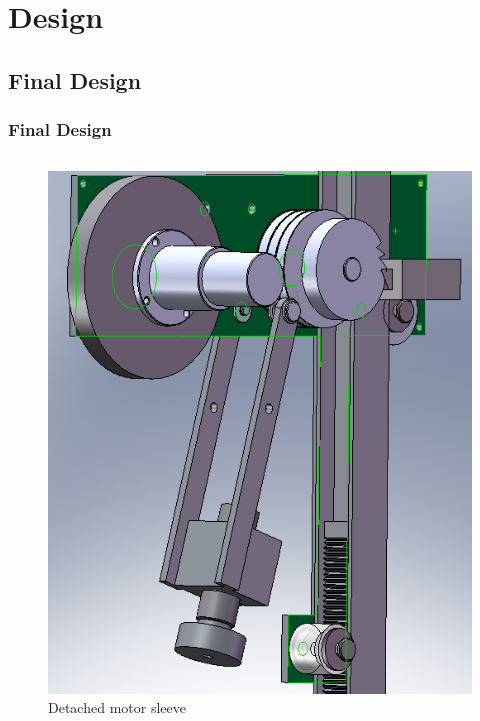 \section{Design}
\subsection*{Final Design}

\begin{frame}
\frametitle{Final Design}

\begin{columns}

\begin{figure}
\centering
\includegraphics[width=\textwidth]{fig/hopper_detach.png}
\caption{Detached motor sleeve}
\end{figure}


\end{columns}
\end{frame}
